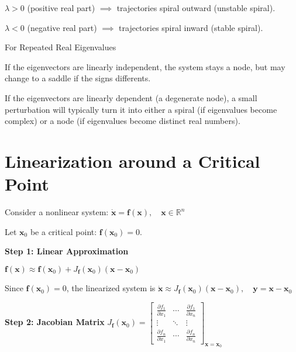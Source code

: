 \begin{tightitemize}
    \item $\lambda > 0$ (positive real part) $\implies$ trajectories spiral outward (unstable spiral).
    \item $\lambda < 0$ (negative real part) $\implies$ trajectories spiral inward (stable spiral).
\end{tightitemize}

For Repeated Real Eigenvalues

\begin{tightitemize}
    \item If the eigenvectors are linearly independent, the system stays a node, but may change to a saddle if the signs differents.
    \item If the eigenvectors are linearly dependent (a degenerate node),
    a small perturbation will typically turn it into either a spiral
    (if eigenvalues become complex) or a node
    (if eigenvalues become distinct real numbers).
\end{tightitemize}

\section*{Linearization around a Critical Point}

Consider a nonlinear system:
$
\dot{\mathbf{x}} = \mathbf{f}(\mathbf{x}), \quad \mathbf{x} \in \mathbb{R}^n
$

Let $\mathbf{x}_0$ be a critical point: $\mathbf{f}(\mathbf{x}_0) = 0$.

\textbf{Step 1: Linear Approximation}

$
\mathbf{f}(\mathbf{x}) \approx \mathbf{f}(\mathbf{x}_0) + J_{\mathbf{f}}(\mathbf{x}_0)(\mathbf{x} - \mathbf{x}_0)
$

Since $\mathbf{f}(\mathbf{x}_0) = 0$, the linearized system is
$
\dot{\mathbf{x}} \approx J_{\mathbf{f}}(\mathbf{x}_0) (\mathbf{x} - \mathbf{x}_0), \quad
\mathbf{y} = \mathbf{x} - \mathbf{x}_0
$

\textbf{Step 2: Jacobian Matrix}
$
J_{\mathbf{f}}(\mathbf{x}_0) =
\begin{bmatrix}
\frac{\partial f_1}{\partial x_1} & \cdots & \frac{\partial f_1}{\partial x_n} \\
\vdots & \ddots & \vdots \\
\frac{\partial f_n}{\partial x_1} & \cdots & \frac{\partial f_n}{\partial x_n}
\end{bmatrix}_{\mathbf{x} = \mathbf{x}_0}
$

